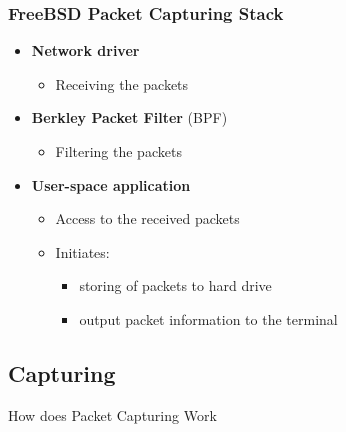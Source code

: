 \documentclass{beamer}
\begin{document}
\begin{frame}
\frametitle{FreeBSD Packet Capturing Stack}
\begin{itemize}
	\item \textbf{Network driver}
		\begin{itemize}
			\item Receiving the packets\newline
		\end{itemize}
	\item \textbf{Berkley Packet Filter} (BPF)
		\begin{itemize}
			\item Filtering the packets\newline
		\end{itemize}
	\item \textbf{User-space application}
		\begin{itemize}
			\item Access to the received packets
			\item Initiates:
				\begin{itemize}
					\item storing of packets to hard drive
					\item output packet information to the terminal
				\end{itemize}
		\end{itemize}
\end{itemize}
\end{frame}

\subsection*{Capturing}
\begin{frame}
	\begin{center}
	\huge{How does Packet Capturing Work}
	\end{center}
\end{frame}
\end{document}
